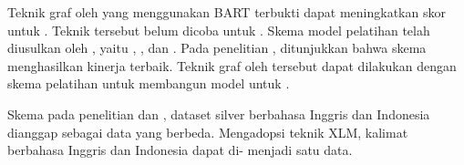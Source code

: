 Teknik \pretraining{} graf oleh \textcite{bai2022} yang menggunakan  \gls{BART} terbukti dapat meningkatkan skor \SMATCH{} untuk \amrparsing{}.
Teknik tersebut belum dicoba untuk \crosslingual{} \amrparsing{}.
Skema model pelatihan \crosslingual{} \amrparsing{} telah diusulkan oleh \textcite{blloshmi2020}, yaitu , , dan .
Pada penelitian \textcite{putra2022}, ditunjukkan bahwa skema  menghasilkan kinerja terbaik.
Teknik \pretraining{} graf oleh \textcite{bai2022} tersebut dapat dilakukan dengan skema pelatihan   untuk membangun model \crosslingual{} untuk  \amrparsing{}.

Skema  pada penelitian \textcite{blloshmi2020} dan \textcite{putra2022}, dataset silver berbahasa Inggris dan Indonesia dianggap sebagai  data yang berbeda.
Mengadopsi teknik \pretraining{} \gls{XLM}, kalimat berbahasa Inggris dan Indonesia dapat di- menjadi satu  data.
